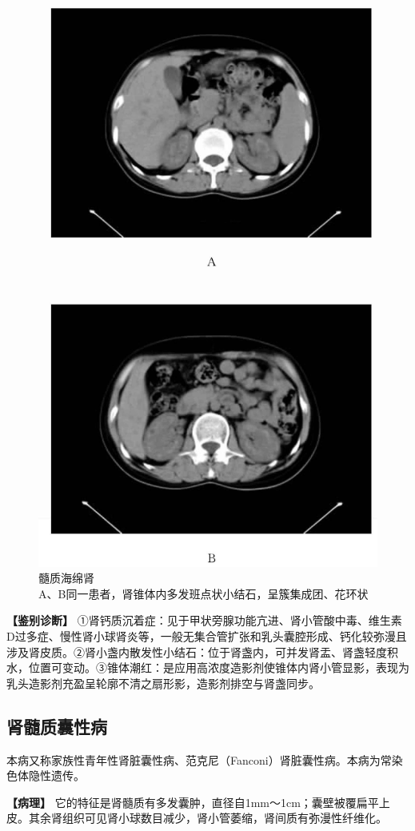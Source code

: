 \begin{figure}[!htbp]
 \centering
 \includegraphics[width=.7\textwidth,height=\textheight,keepaspectratio]{./images/Image00334.jpg}
 \captionsetup{justification=centering}
 \caption{髓质海绵肾\\{\small A、B同一患者，肾锥体内多发班点状小结石，呈簇集成团、花环状}}
 \label{fig15-18}
  \end{figure} 

\textbf{【鉴别诊断】}
①肾钙质沉着症：见于甲状旁腺功能亢进、肾小管酸中毒、维生素D过多症、慢性肾小球肾炎等，一般无集合管扩张和乳头囊腔形成、钙化较弥漫且涉及肾皮质。②肾小盏内散发性小结石：位于肾盏内，可并发肾盂、肾盏轻度积水，位置可变动。③锥体潮红：是应用高浓度造影剂使锥体内肾小管显影，表现为乳头造影剂充盈呈轮廓不清之扇形影，造影剂排空与肾盏同步。

\subsection{肾髓质囊性病}

本病又称家族性青年性肾脏囊性病、范克尼（Fanconi）肾脏囊性病。本病为常染色体隐性遗传。

\textbf{【病理】}
它的特征是肾髓质有多发囊肿，直径自1mm～1cm；囊壁被覆扁平上皮。其余肾组织可见肾小球数目减少，肾小管萎缩，肾间质有弥漫性纤维化。

